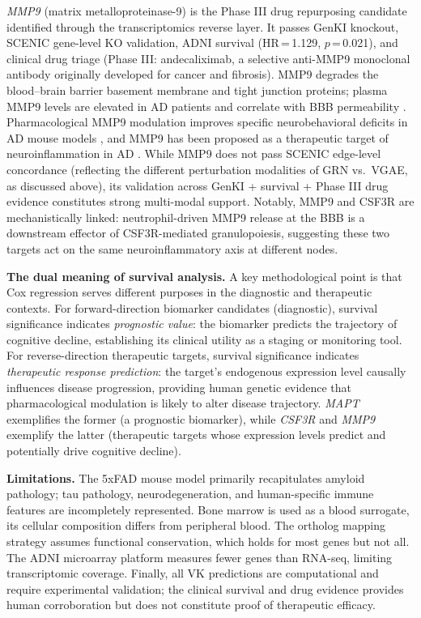\documentclass[12pt,a4paper]{article}
\begin{document}
\textit{MMP9} (matrix metalloproteinase-9) is the Phase III drug repurposing candidate identified through the transcriptomics reverse layer. It passes GenKI knockout, SCENIC gene-level KO validation, ADNI survival (HR\,=\,1.129, $p$\,=\,0.021), and clinical drug triage (Phase III: andecaliximab, a selective anti-MMP9 monoclonal antibody originally developed for cancer and fibrosis). MMP9 degrades the blood--brain barrier basement membrane and tight junction proteins; plasma MMP9 levels are elevated in AD patients and correlate with BBB permeability \citep{lorenzl2003, viggars2021}. Pharmacological MMP9 modulation improves specific neurobehavioral deficits in AD mouse models \citep{mmp9mouse2021}, and MMP9 has been proposed as a therapeutic target of neuroinflammation in AD \citep{li2025mmp}. While MMP9 does not pass SCENIC edge-level concordance (reflecting the different perturbation modalities of GRN vs.\ VGAE, as discussed above), its validation across GenKI + survival + Phase III drug evidence constitutes strong multi-modal support. Notably, MMP9 and CSF3R are mechanistically linked: neutrophil-driven MMP9 release at the BBB is a downstream effector of CSF3R-mediated granulopoiesis, suggesting these two targets act on the same neuroinflammatory axis at different nodes.

\textbf{The dual meaning of survival analysis.}
A key methodological point is that Cox regression serves different purposes in the diagnostic and therapeutic contexts. For forward-direction biomarker candidates (diagnostic), survival significance indicates \emph{prognostic value}: the biomarker predicts the trajectory of cognitive decline, establishing its clinical utility as a staging or monitoring tool. For reverse-direction therapeutic targets, survival significance indicates \emph{therapeutic response prediction}: the target's endogenous expression level causally influences disease progression, providing human genetic evidence that pharmacological modulation is likely to alter disease trajectory. \textit{MAPT} exemplifies the former (a prognostic biomarker), while \textit{CSF3R} and \textit{MMP9} exemplify the latter (therapeutic targets whose expression levels predict and potentially drive cognitive decline).

\textbf{Limitations.}
The 5xFAD mouse model primarily recapitulates amyloid pathology; tau pathology, neurodegeneration, and human-specific immune features are incompletely represented. Bone marrow is used as a blood surrogate, its cellular composition differs from peripheral blood. The ortholog mapping strategy assumes functional conservation, which holds for most genes but not all. The ADNI microarray platform measures fewer genes than RNA-seq, limiting transcriptomic coverage. Finally, all VK predictions are computational and require experimental validation; the clinical survival and drug evidence provides human corroboration but does not constitute proof of therapeutic efficacy.
\end{document}
